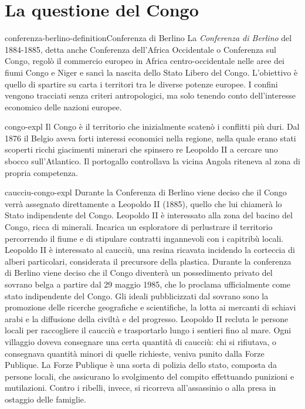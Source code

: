 \documentclass[preview]{standalone}
\begin{document}
\section{La questione del Congo}

\begin{snippetdefinition}{conferenza-berlino-definition}{Conferenza di Berlino}
    La \textit{Conferenza di Berlino} del 1884-1885,
    detta anche Conferenza dell'Africa Occidentale o Conferenza sul Congo,
    regolò il commercio europeo in Africa
    centro-occidentale nelle aree dei fiumi Congo e Niger e sancì la
    nascita dello Stato Libero del Congo.
    L'obiettivo è quello di spartire su carta i territori tra le diverse potenze europee. 
    I confini vengono tracciati senza criteri antropologici,
    ma solo tenendo conto dell'interesse economico
    delle nazioni europee.
\end{snippetdefinition}

\begin{snippet}{congo-expl}
    Il Congo è il territorio che inizialmente scatenò i conflitti più duri.
    Dal 1876 il Belgio aveva forti interessi economici nella regione, nella quale
    erano stati scoperti ricchi giacimenti minerari che spinsero re Leopoldo II a cercare
    uno sbocco sull'Atlantico. Il portogallo controllava la vicina Angola riteneva al zona di propria competenza.
\end{snippet}

\begin{snippet}{caucciu-congo-expl}
    Durante la Conferenza di Berlino viene deciso che il Congo verrà assegnato
    direttamente a Leopoldo II (1885), quello che lui chiamerà lo Stato indipendente del Congo.
    Leopoldo II è interessato alla zona del bacino del Congo, ricca di
    minerali. Incarica un esploratore di perlustrare il territorio percorrendo il fiume e di stipulare
    contratti ingannevoli con i capitribù locali. Leopoldo II è interessato al caucciù, una resina
    ricavata incidendo la corteccia di alberi particolari, considerata il precursore della plastica.
    Durante la conferenza di Berlino viene deciso che il Congo diventerà un possedimento
    privato del sovrano belga a partire dal 29 maggio 1985, che lo proclama ufficialmente come
    stato indipendente del Congo. Gli ideali pubblicizzati dal sovrano sono la promozione delle
    ricerche geografiche e scientifiche, la lotta ai mercanti di schiavi arabi e la diffusione della
    civiltà e del progresso. Leopoldo II recluta le persone locali per raccogliere il caucciù e
    trasportarlo lungo i sentieri fino al mare. Ogni villaggio doveva consegnare una certa
    quantità di caucciù: chi si rifiutava, o consegnava quantità minori di quelle richieste, veniva
    punito dalla Forze Publique. La Forze Publique è una sorta di polizia dello stato, composta
    da persone locali, che assicurano lo svolgimento del compito effettuando punizioni e
    mutilazioni. Contro i ribelli, invece, si ricorreva all'assassinio o alla presa in ostaggio delle
    famiglie.
\end{snippet}
\end{document}

